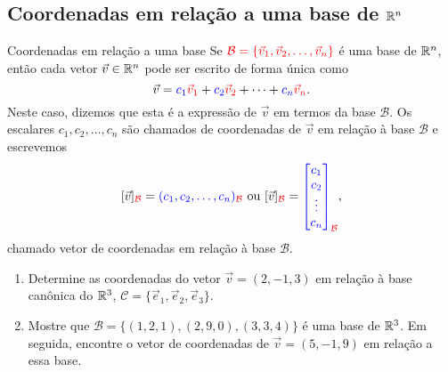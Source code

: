


\subsection*{Coordenadas em relação a uma base de $\mathbb{R}^n$}
\begin{frame}[label=lild]{Coordenadas em relação a uma base}
Se ${\color{red}\mathcal{B}=\{\vec{v}_1,\vec{v}_2,\ldots,\vec{v}_n\}}$ é uma base de $\mathbb{R}^n$, então cada vetor $\vec{v}\in \mathbb{R}^n$ pode ser escrito de forma única como
\[\vec{v}={\color{blue}c_1}{\color{red}\vec{v}_1}+{\color{blue}c_2}{\color{red}\vec{v}_2}+\cdots+{\color{blue}c_n}{\color{red}\vec{v}_n}.\]
Neste caso, dizemos que esta é a {\color{blue}expressão de $\vec{v}$ em termos da base $\mathcal{B}$}. Os escalares {\color{blue}$c_1,c_2,\ldots,c_n$} são chamados de {\color{blue}coordenadas} de $\vec{v}$ em relação à base $\mathcal{B}$ e escrevemos 
\[
[\vec{v}]_{{\color{red}\mathcal{B}}}=
{\color{blue}(c_1,c_2,\ldots,c_n)}_{{\color{red}\mathcal{B}}} \text{ ou }
[\vec{v}]_{{\color{red}\mathcal{B}}}=
{\color{blue}
\begin{bmatrix}
c_1 \\ c_2 \\ \vdots \\ c_n
\end{bmatrix}_{{\color{red}\mathcal{B}}}},
\]
chamado {\color{blue}vetor de coordenadas em relação à base $\mathcal{B}$}.

\end{frame}

\begin{frame}[label=lild]{}
\begin{exe}
\begin{enumerate}

\item Determine as coordenadas do vetor $\vec{v}=(2,-1,3)$ em relação à base canônica do $\mathbb{R}^3$, $\mathcal{C}=\{\vec{e}_1,\vec{e}_2,\vec{e}_3\}$.

\item Mostre que $\mathcal{B}=\{(1,2,1),(2,9,0),(3,3,4)\}$ é uma base de $\mathbb{R}^3$. Em seguida, encontre o vetor de coordenadas de $\vec{v}=(5,-1,9)$ em relação a essa base.
\end{enumerate}
\end{exe}
\end{frame}